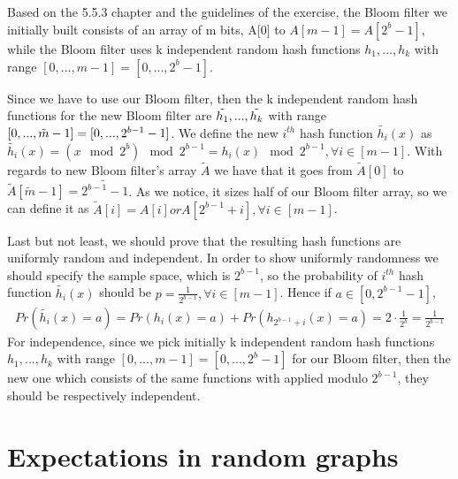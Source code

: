 \documentclass[11pt]{537homework}
\begin{document}
\subsection{}
Based on the 5.5.3 chapter and the guidelines of the exercise, the Bloom filter we initially built consists of an array of m bits, A[0] to $A[m-1]=A[2^b -1]$, while the Bloom filter uses k independent random hash functions $h_1,...,h_k$ with range $[0,...,m-1]= [0,...,2^b-1]$.
\par Since we have to use our Bloom filter, then the k independent random hash functions for the new Bloom filter are $\Tilde{h_1},...,\Tilde{h_k}$ with range $[0,...,\Tilde{m}-1]=[0,...,2^{b-1}-1]$. We define the new $i^{th}$ hash function $\tilde{h_i}(x)$ as $\tilde{h_i}(x) = (x \mod 2^b) \mod 2^{b-1} = h_i(x) \mod 2^{b-1} ,\forall i \in [m-1]$. With regards to new Bloom filter's array $\tilde{A}$ we have that it goes from $\tilde{A}[0]$ to $\tilde{A}[\tilde{m}-1]=\tilde{2^{b-1}-1}$. As we notice, it sizes half of our Bloom filter array, so we can define it as $\tilde{A}[i] = A[i] or A[2^{b-1} + i] ,\forall i \in [m-1]$.
\par Last but not least, we should prove that the resulting hash functions are uniformly random and independent. In order to show uniformly randomness we should specify the sample space, which is $2^{b-1}$, so the probability of $i^{th}$ hash function $\tilde{h_i}(x)$ should be $p = \frac{1}{2^{b-1}},\forall i \in [m-1]$. Hence if $a\in[0,2^{b-1}-1]$,
\begin{align*}
    Pr(\tilde{h_i}(x) = a) = Pr(h_i(x) = a) + Pr(h_{2^{b-1}+i}(x) = a) = 2 \cdot \frac{1}{2^b} = \frac{1}{2^{b-1}} 
\end{align*}
For independence, since we pick initially k independent random hash functions $h_1,...,h_k$ with range $[0,...,m-1]= [0,...,2^b-1]$ for our Bloom filter, then the new one which consists of the same functions with applied modulo $2^{b-1}$, they should be respectively independent. 

\section{Expectations in random graphs}
\end{document}
